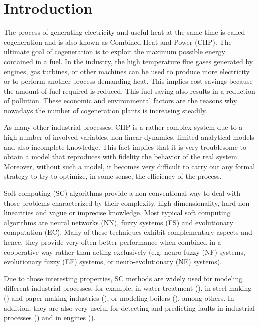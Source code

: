 \section{Introduction}
\label{intro}

The process of generating electricity and useful heat at the same time is called cogeneration and is also known as Combined Heat and Power (CHP). The ultimate goal of cogeneration is to exploit the maximum possible energy contained in a fuel. In the industry, the high temperature flue gases generated by engines, gas turbines, or other machines can be used to produce more electricity or to perform another process demanding heat. This implies cost savings because the amount of fuel required is reduced. This fuel saving also results in a reduction of pollution. These economic and environmental factors are the reasons why nowadays the number of cogeneration plants is increasing steadily. 

As many other industrial processes, CHP is a rather complex system due to a high number of involved variables, non-linear dynamics, limited analytical models and also incomplete knowledge. This fact implies that it is very troublesome to obtain a model that reproduces with fidelity the behavior of the real system. Moreover, without such a model, it becomes very difficult to carry out any formal strategy to try to optimize, in some sense, the efficiency of the process.

Soft computing (SC) algorithms provide a non-conventional way to deal with those problems characterized by their complexity, high dimensionality, hard non-linearities and vague or imprecise knowledge. Most typical soft computing algorithms are neural networks (NN), fuzzy systems (FS) and evolutionary computation (EC). Many of these techniques exhibit complementary  aspects and hence, they provide very often better performance when combined in a cooperative way rather than acting exclusively (e.g. neuro-fuzzy (NF) systems, evolutionary fuzzy (EF) systems, or neuro-evolutionary (NE) systems).

Due to those interesting properties, SC methods are widely used for modeling different industrial processes, for example, in water-treatment (\cite{Noshadi-2013}), in steel-making (\cite{Isazadeh-2012}) and paper-making industries (\cite{Zhang-2012}), or modeling boilers (\cite{Budnik-2012,Huang-2009}), among others. In addition, they are also very useful for detecting and predicting faults in industrial processes (\cite{Rakhshani-2009,Lemma-2013}) and in engines (\cite{Shatnawi-2014,Ghate-2011,Refaat-2013}). 

